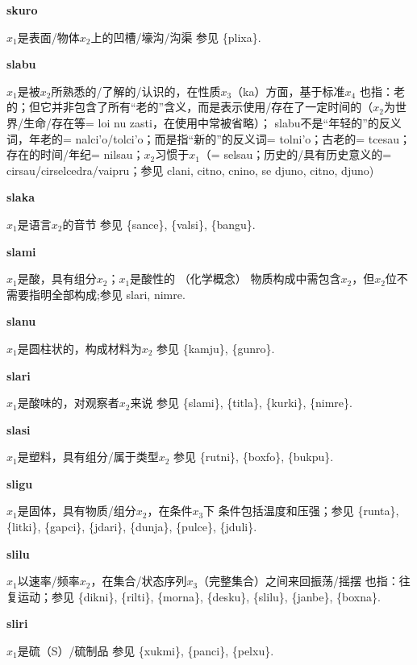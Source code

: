 \documentclass[notitlepage,twocolumn,a4paper,10pt]{book}
\begin{document}
{\sffamily\bfseries skuro}\enspace {\ttfamily\bfseries[        ku'o]}  $x_1$是表面\slash{}物体$x_2$上的凹槽\slash{}壕沟\slash{}沟渠 \textemdash{} 参见 \{plixa\}.

{\sffamily\bfseries slabu}\enspace {\ttfamily\bfseries[        sau]}  $x_1$是被$x_2$所熟悉的\slash{}了解的\slash{}认识的，在性质$x_3$（ka）方面，基于标准$x_4$ \textemdash{} 也指：老的；但它并非包含了所有“老的”含义，而是表示使用\slash{}存在了一定时间的（$x_2$为世界\slash{}生命\slash{}存在等= loi nu {zasti}，在使用中常被省略）； slabu不是“年轻的”的反义词，年老的= {nalci'o}\slash{}{tolci'o}；而是指“新的”的反义词= {tolni'o}；古老的= {tcesau}；存在的时间\slash{}年纪= {nilsau}；$x_2$习惯于$x_1$（= {selsau}；历史的\slash{}具有历史意义的= {cirsau}\slash{}{cirselcedra}\slash{}{vaipru}；参见 {clani}, {citno}, {cnino}, se {djuno}, {citno}, {djuno})

{\sffamily\bfseries slaka} $x_1$是语言$x_2$的音节 \textemdash{} 参见 \{sance\}, \{valsi\}, \{bangu\}.

{\sffamily\bfseries slami} $x_1$是酸，具有组分$x_2$；$x_1$是酸性的 （化学概念） \textemdash{} 物质构成中需包含$x_2$，但$x_2$位不需要指明全部构成;参见 {slari}, {nimre}.

{\sffamily\bfseries slanu} $x_1$是圆柱状的，构成材料为$x_2$ \textemdash{} 参见 \{kamju\}, \{gunro\}.

{\sffamily\bfseries slari}\enspace {\ttfamily\bfseries[sar]}  $x_1$是酸味的，对观察者$x_2$来说 \textemdash{} 参见 \{slami\}, \{titla\}, \{kurki\}, \{nimre\}.

{\sffamily\bfseries slasi}\enspace {\ttfamily\bfseries[las]}  $x_1$是塑料，具有组分\slash{}属于类型$x_2$ \textemdash{} 参见 \{rutni\}, \{boxfo\}, \{bukpu\}.

{\sffamily\bfseries sligu}\enspace {\ttfamily\bfseries[lig]}  $x_1$是固体，具有物质\slash{}组分$x_2$，在条件$x_3$下 \textemdash{} 条件包括温度和压强；参见 \{runta\}, \{litki\}, \{gapci\}, \{jdari\}, \{dunja\}, \{pulce\}, \{jduli\}.

{\sffamily\bfseries slilu}\enspace {\ttfamily\bfseries[    sli]}  $x_1$以速率\slash{}频率$x_2$，在集合\slash{}状态序列$x_3$（完整集合）之间来回振荡\slash{}摇摆 \textemdash{} 也指：往复运动；参见 \{dikni\}, \{rilti\}, \{morna\}, \{desku\}, \{slilu\}, \{janbe\}, \{boxna\}.

{\sffamily\bfseries sliri} $x_1$是硫（S）\slash{}硫制品 \textemdash{} 参见 \{xukmi\}, \{panci\}, \{pelxu\}.
\end{document}

